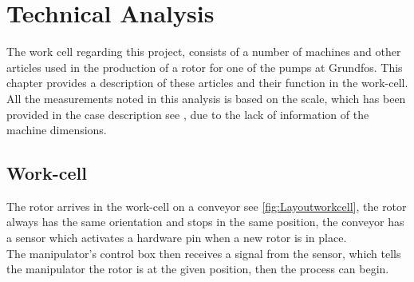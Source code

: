  \chapter{Technical Analysis} \label{TechAnalysis}
 
The work cell regarding this project, consists of a number of machines and other articles used in the production of a rotor for one of the pumps at Grundfos. This chapter provides a description of these articles and their function in the work-cell\cite{robotsave}. All the measurements noted in this analysis is based on the scale, which has been provided in the case description see \cite{Case}, due to the lack of information of the machine dimensions. \\ 
 


 \section{Work-cell}
 The rotor arrives in the work-cell on a conveyor see \ref{fig:Layoutworkcell}, the rotor always has the same orientation and stops in the same position, the conveyor has a sensor which activates a hardware pin when a new rotor is in place.\\
 The manipulator's control box then receives a signal from the sensor, which tells the manipulator the rotor is at the given position, then the process can begin.\\



